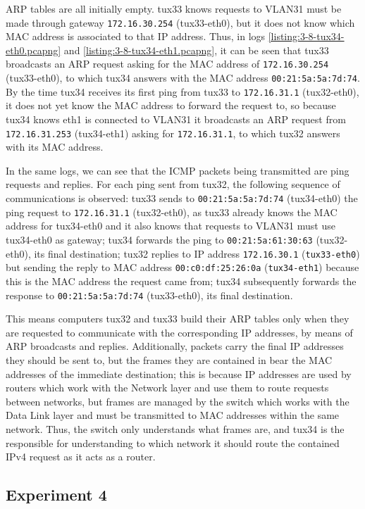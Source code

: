 \documentclass[a4paper, 11pt]{report}
\begin{document}
ARP tables are all initially empty.
tux33 knows requests to VLAN31 must be made through gateway \texttt{172.16.30.254} (tux33-eth0), but it does not know which MAC address is associated to that IP address.
Thus, in logs \ref{listing:3-8-tux34-eth0.pcapng} and \ref{listing:3-8-tux34-eth1.pcapng}, it can be seen that tux33 broadcasts an ARP request asking for the MAC address of \texttt{172.16.30.254} (tux33-eth0), to which tux34 answers with the MAC address \texttt{00:21:5a:5a:7d:74}.
By the time tux34 receives its first ping from tux33 to \texttt{172.16.31.1} (tux32-eth0), it does not yet know the MAC address to forward the request to, so because tux34 knows eth1 is connected to VLAN31 it broadcasts an ARP request from \texttt{172.16.31.253} (tux34-eth1) asking for \texttt{172.16.31.1}, to which tux32 answers with its MAC address.

In the same logs, we can see that the ICMP packets being transmitted are ping requests and replies. For each ping sent from tux32, the following sequence of communications is observed:
tux33 sends to \texttt{00:21:5a:5a:7d:74} (tux34-eth0) the ping request to \texttt{172.16.31.1} (tux32-eth0), as tux33 already knows the MAC address for tux34-eth0 and it also knows that requests to VLAN31 must use tux34-eth0 as gateway;
tux34 forwards the ping to \texttt{00:21:5a:61:30:63} (tux32-eth0), its final destination;
tux32 replies to IP address \texttt{172.16.30.1} (\texttt{tux33-eth0}) but sending the reply to MAC address \texttt{00:c0:df:25:26:0a} (\texttt{tux34-eth1}) because this is the MAC address the request came from;
tux34 subsequently forwards the response to \texttt{00:21:5a:5a:7d:74} (tux33-eth0), its final destination.

This means computers tux32 and tux33 build their ARP tables only when they are requested to communicate with the corresponding IP addresses, by means of ARP broadcasts and replies. Additionally, packets carry the final IP addresses they should be sent to, but the frames they are contained in bear the MAC addresses of the immediate destination; this is because IP addresses are used by routers which work with the Network layer and use them to route requests between networks, but frames are managed by the switch which works with the Data Link layer and must be transmitted to MAC addresses within the same network. Thus, the switch only understands what frames are, and tux34 is the responsible for understanding to which network it should route the contained IPv4 request as it acts as a router.

\subsection{Experiment 4} \label{sec:Exp4}
\end{document}
